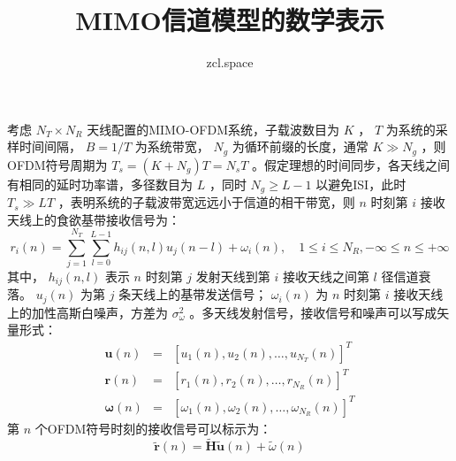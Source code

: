 \documentclass[10pt,a4paper,UTF8]{article}
\author{zcl.space}
\date{}
\title{MIMO信道模型的数学表示}
\begin{document}
\maketitle
\tableofcontents
{}
考虑 \(N_{T}\times N_{R}\) 天线配置的MIMO-OFDM系统，子载波数目为 \(K\) ， \(T\) 为系统的采样时间间隔， \(B=1/T\) 为系统带宽， \(N_g\) 为循环前缀的长度，通常 \(K\gg N_g\) ，则OFDM符号周期为 \(T_s=(K+N_g)T=N_sT\) 。假定理想的时间同步，各天线之间有相同的延时功率谱，多径数目为 \(L\) ，同时 \(N_g \ge L-1\)  以避免ISI，此时 \(T_s \gg LT\) ，表明系统的子载波带宽远远小于信道的相干带宽，则 \(n\) 时刻第 \(i\) 接收天线上的食欲基带接收信号为：
\begin{equation}
  \label{eq:rxsignal}
  r_i(n) = \sum_{j=1}^{N_T}\sum_{l=0}^{L-1} h_{ij}(n,l)u_j(n-l) + \omega_i(n),\quad 1\le i \le N_R, -\infty \le n\le +\infty
\end{equation}
其中， \(h_{ij}(n,l)\) 表示 \(n\) 时刻第 \(j\) 发射天线到第 \(i\) 接收天线之间第 \(l\) 径信道衰落。 \(u_j(n)\) 为第 \(j\)  条天线上的基带发送信号； \(\omega_i(n)\) 为 \(n\) 时刻第 \(i\) 接收天线上的加性高斯白噪声，方差为 \(\sigma_{\omega}^2\) 。多天线发射信号，接收信号和噪声可以写成矢量形式：
\begin{eqnarray}
  \pmb{u}(n) &=& [u_1(n), u_2(n), \dots, u_{N_T}(n)]^T \nonumber \\
  \pmb{r}(n) &=& [r_1(n), r_2(n), \dots, r_{N_R}(n)]^T \nonumber \\
  \pmb{\omega}(n) &=& [\omega_1(n), \omega_2(n), \dots, \omega_{N_R}(n)]^T \nonumber
\end{eqnarray}
第 \(n\) 个OFDM符号时刻的接收信号可以标示为：
\begin{equation}
  \label{eq:nofdm}
  \tilde{\pmb{r}}(n) = \tilde{\pmb{H}}\tilde{\pmb{u}}(n) + \tilde{\omega} (n)
\end{equation}
\end{document}
